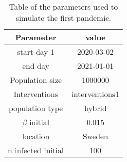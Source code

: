 \begin{table}[htbp]
    \centering
    \caption{Table of the parameters used to simulate the first pandemic.}
    \label{tab:parameters_covasim}
    \begin{tabular}{|c|c|}
        \hline
        \textbf{Parameter} & \textbf{value}  \\
        \hline
        start day 1 & 2020-03-02\\
        \hline

        end day  & 2021-01-01\\
        \hline

        Population size &1000000\\
        \hline

        Interventions & interventions1\\
        \hline

        population type& hybrid\\

        \hline

        $\beta$ initial  & 0.015\\
        \hline

        location  & Sweden \\
        \hline

        n infected initial &100\\
        \hline
    \end{tabular}
\end{table}
